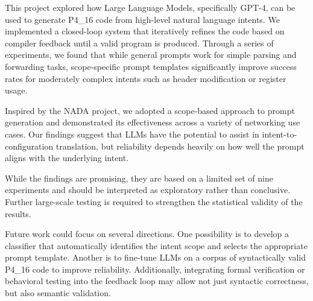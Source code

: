 \documentclass[sigconf]{acmart}
\begin{document}
This project explored how Large Language Models, specifically GPT-4, can be used to generate P4\_16 code from high-level natural language intents. We implemented a closed-loop system that iteratively refines the code based on compiler feedback until a valid program is produced. Through a series of experiments, we found that while general prompts work for simple parsing and forwarding tasks, scope-specific prompt templates significantly improve success rates for moderately complex intents such as header modification or register usage.

Inspired by the NADA project, we adopted a scope-based approach to prompt generation and demonstrated its effectiveness across a variety of networking use cases. Our findings suggest that LLMs have the potential to assist in intent-to-configuration translation, but reliability depends heavily on how well the prompt aligns with the underlying intent.

While the findings are promising, they are based on a limited set of nine experiments and should be interpreted as exploratory rather than conclusive. Further large-scale testing is required to strengthen the statistical validity of the results.

Future work could focus on several directions. One possibility is to develop a classifier that automatically identifies the intent scope and selects the appropriate prompt template. Another is to fine-tune LLMs on a corpus of syntactically valid P4\_16 code to improve reliability. Additionally, integrating formal verification or behavioral testing into the feedback loop may allow not just syntactic correctness, but also semantic validation. 





\end{document}
